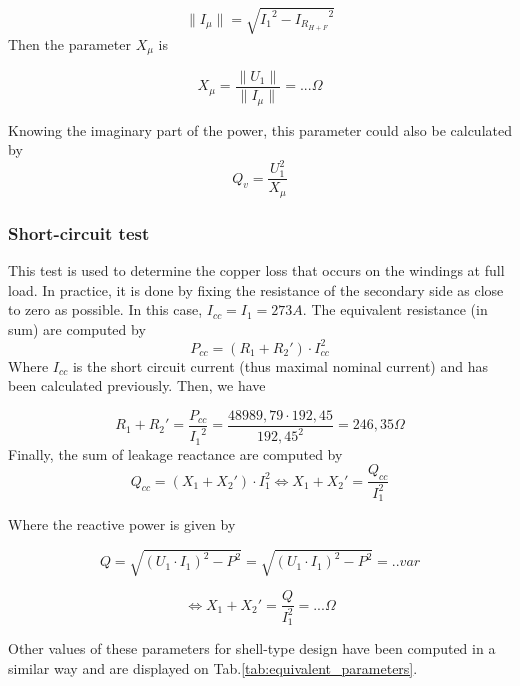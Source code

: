 \documentclass[12pt,a4paper]{report}
\begin{document}
\begin{equation}
    \|I_{\mu}\| = \sqrt{{I_1}^2 - {I_{R_{H+F}}}^2}
\end{equation}
Then the parameter $X_\mu$ is

\begin{equation}
    X_\mu = \frac{\|U_1\|}{\|I_{\mu}\|} = ... \Omega
\end{equation}

Knowing the imaginary part of the power, this parameter could also be calculated by 
\begin{equation}
   Q_v = \frac{U_1^2}{X_{\mu}}
\end{equation}

\subsubsection{Short-circuit test}
This test is used to determine the copper loss that occurs on the windings at full load. In practice, it is done by fixing the resistance of the secondary side as close to zero as possible. In this case, $I_{cc} = I_1 = 273 A$. The equivalent resistance (in sum) are computed by
\begin{equation}
P_{cc} = (R_1 + R_2') \cdot I_{cc}^2
\end{equation}
Where $I_{cc}$ is the short circuit current (thus maximal nominal current) and has been calculated previously. Then, we have

\begin{equation}
    R_1 + R_2' = \frac{P_{cc}}{{I_1}^2} = \frac{48989,79 \cdot 192,45}{192,45^2} = 246,35 \Omega
\end{equation}
Finally, the sum of leakage reactance are computed by
\begin{equation}
Q_{cc} = (X_1 + X_2') \cdot I_1^2 \iff X_1 + X_2' = \frac{Q_{cc}}{I_1^2}
\end{equation}

Where the reactive power is given by

\begin{equation}
    Q = \sqrt{(U_1 \cdot I_1)^2-P^2} = \sqrt{(U_1 \cdot I_1)^2-P^2} = .. var
\end{equation}

\begin{equation}
    \iff X_1 + X_2' = \frac{Q}{I_1^2} = ... \Omega
\end{equation}

Other values of these parameters for shell-type design have been computed in a similar way and are displayed on Tab.\ref{tab:equivalent_parameters}.
\end{document}

